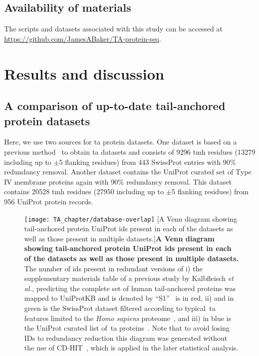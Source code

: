 \subsection{Availability of materials}

The scripts and datasets associated with this study can be accessed at \url{https://github.com/JamesABaker/TA-protein-seq}.

\section{Results and discussion}

\subsection{A comparison of up-to-date tail-anchored protein datasets}
Here, we use two sources for \gls{ta} protein datasets.
One dataset is based on a previous method~\cite{Kalbfleisch2007} to obtain \gls{ta} datasets and consists of 9296 \gls{tmh} residues (13279 including up to $\pm$5 flanking residues) from 443 SwissProt entries with 90\% redundancy removal.
Another dataset contains the UniProt curated set of Type IV membrane proteins again with 90\% redundancy removal.
This dataset contains 20528 \gls{tmh} residues (27950 including up to $\pm$5 flanking residues) from 956 UniProt protein records.

\begin{figure}
\centering
\texttt{[image: TA\_chapter/database-overlap]}
        [A Venn diagram showing tail-anchored protein UniProt ids present in each of the datasets as well as those present in multiple datasets.]{\textbf{A Venn diagram showing tail-anchored protein UniProt ids present in each of the datasets as well as those present in multiple datasets.}
The number of ids present in redundant versions of
i) the supplementary materials table of a previous study by Kalbfleisch \textit{et al.,} predicting the complete set of human tail-anchored proteins was mapped to UniProtKB and is denoted by ``S1''~\cite{Kalbfleisch2007} is in red,
ii) and in green is the SwissProt dataset filtered according to typical~\gls{ta} features limited to the \textit{Homo sapiens} proteome~\cite{TheUniProtConsortium2014}, and
iii) in blue is the UniProt curated list of~\gls{ta} proteins~\cite{TheUniProtConsortium2014}.
Note that to avoid losing IDs to redundancy reduction this diagram was generated without the use of CD-HIT~\cite{Huang2010, Wu2011}, which is applied in the later statistical analysis.}

\label{fig:tadatasetoverlap}
\end{figure}

